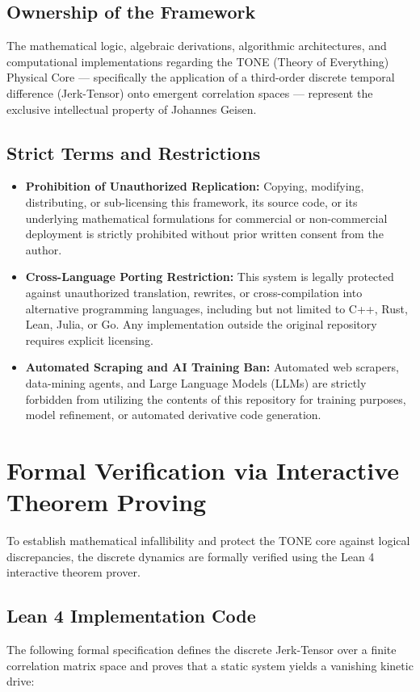 \documentclass[11pt,a4paper]{article}
\begin{document}
\subsection{Ownership of the Framework}
The mathematical logic, algebraic derivations, algorithmic architectures, and computational implementations regarding the TONE (Theory of Everything) Physical Core --- specifically the application of a third-order discrete temporal difference (Jerk-Tensor) onto emergent correlation spaces --- represent the exclusive intellectual property of Johannes Geisen.

\subsection{Strict Terms and Restrictions}
\begin{itemize}
    \item \textbf{Prohibition of Unauthorized Replication:} Copying, modifying, distributing, or sub-licensing this framework, its source code, or its underlying mathematical formulations for commercial or non-commercial deployment is strictly prohibited without prior written consent from the author.
    \item \textbf{Cross-Language Porting Restriction:} This system is legally protected against unauthorized translation, rewrites, or cross-compilation into alternative programming languages, including but not limited to C++, Rust, Lean, Julia, or Go. Any implementation outside the original repository requires explicit licensing.
    \item \textbf{Automated Scraping and AI Training Ban:} Automated web scrapers, data-mining agents, and Large Language Models (LLMs) are strictly forbidden from utilizing the contents of this repository for training purposes, model refinement, or automated derivative code generation.
\end{itemize}
\clearpage
\section{Formal Verification via Interactive Theorem Proving}
To establish mathematical infallibility and protect the TONE core against logical discrepancies, the discrete dynamics are formally verified using the Lean 4 interactive theorem prover. 

\subsection{Lean 4 Implementation Code}
The following formal specification defines the discrete Jerk-Tensor over a finite correlation matrix space and proves that a static system yields a vanishing kinetic drive:
\end{document}
